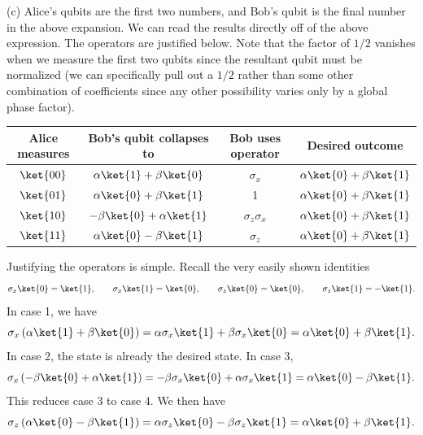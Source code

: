 \documentclass[11pt, letterpaper]{article}
\begin{document}
(c) Alice's qubits are the first two numbers, and Bob's qubit is the final number in the above expansion. We can read the results directly off of the above expression. The operators are justified below. Note that the factor of $1/2$ vanishes when we measure the first two qubits since the resultant qubit must be normalized (we can specifically pull out a $1/2$ rather than some other combination of coefficients since any other possibility varies only by a global phase factor). 
\begin{center}
\begin{tabular}{|c|c|c|c|}
	\hline
	Alice measures & Bob's qubit collapses to & Bob uses operator & Desired outcome\\
	\hline
	$\ket{00}$ & $\alpha \ket{1}+\beta \ket{0}$ & $\sigma _x$ & $\alpha \ket{0}+\beta \ket{1}$\\
	\hline
	$\ket{01}$ & $\alpha \ket{0}+\beta \ket{1}$ & 1 & $\alpha \ket{0}+\beta \ket{1}$\\
	\hline
	$\ket{10}$ & $-\beta \ket{0}+\alpha \ket{1}$ & $\sigma _z\sigma _x$ & $\alpha \ket{0}+\beta \ket{1}$\\
	\hline
	$\ket{11}$ & $\alpha \ket{0}-\beta \ket{1}$ & $\sigma _z$ & $\alpha \ket{0}+\beta \ket{1}$\\
	\hline
\end{tabular}
\end{center}
Justifying the operators is simple. Recall the very easily shown identities
\[
	\sigma _x\ket{0}=\ket{1},\qquad \sigma _x\ket{1}=\ket{0},\qquad \sigma _z\ket{0}=\ket{0},\qquad \sigma _z\ket{1}=-\ket{1}
.\]
In case 1, we have
\[
	\sigma _x\left( \alpha \ket{1}+\beta \ket{0} \right) =\alpha \sigma _x\ket{1}+\beta \sigma _x\ket{0}=\alpha \ket{0}+\beta \ket{1}
.\]
In case 2, the state is already the desired state. In case 3,
\[
	\sigma _x\left( -\beta \ket{0}+\alpha \ket{1} \right) =-\beta \sigma _x\ket{0}+\alpha \sigma _x\ket{1}=\alpha \ket{0}-\beta \ket{1}
.\]
This reduces case 3 to case 4. We then have
\[
	\sigma _z\left( \alpha \ket{0}-\beta \ket{1} \right) =\alpha \sigma _z\ket{0}-\beta \sigma _z\ket{1}=\alpha \ket{0}+\beta \ket{1}
.\]
\end{document}
